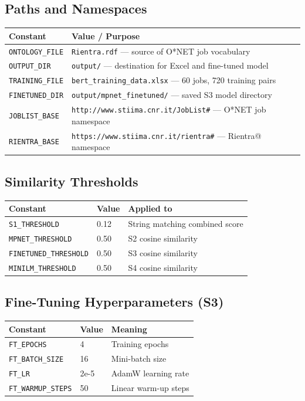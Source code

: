 ﻿\documentclass[12pt,a4paper]{article}
\begin{document}
\subsection{Paths and Namespaces}

\begin{longtable}{@{}P{4.5cm}P{10cm}@{}}
\toprule
\textbf{Constant} & \textbf{Value / Purpose} \\
\midrule
\endhead
\texttt{ONTOLOGY\_FILE} & \texttt{Rientra.rdf} --- source of O*NET job vocabulary \\
\texttt{OUTPUT\_DIR} & \texttt{output/} --- destination for Excel and fine-tuned model \\
\texttt{TRAINING\_FILE} & \texttt{bert\_training\_data.xlsx} --- 60 jobs, 720 training pairs \\
\texttt{FINETUNED\_DIR} & \texttt{output/mpnet\_finetuned/} --- saved S3 model directory \\
\texttt{JOBLIST\_BASE} & \texttt{http://www.stiima.cnr.it/JobList\#} --- O*NET job namespace \\
\texttt{RIENTRA\_BASE} & \texttt{https://www.stiima.cnr.it/rientra\#} --- Rientra@ namespace \\
\bottomrule
\end{longtable}

\subsection{Similarity Thresholds}

\begin{longtable}{@{}P{4.5cm}P{3cm}P{7cm}@{}}
\toprule
\textbf{Constant} & \textbf{Value} & \textbf{Applied to} \\
\midrule
\endhead
\texttt{S1\_THRESHOLD} & 0.12 & String matching combined score \\
\texttt{MPNET\_THRESHOLD} & 0.50 & S2 cosine similarity \\
\texttt{FINETUNED\_THRESHOLD} & 0.50 & S3 cosine similarity \\
\texttt{MINILM\_THRESHOLD} & 0.50 & S4 cosine similarity \\
\bottomrule
\end{longtable}

\subsection{Fine-Tuning Hyperparameters (S3)}

\begin{longtable}{@{}P{4cm}P{3cm}P{7.5cm}@{}}
\toprule
\textbf{Constant} & \textbf{Value} & \textbf{Meaning} \\
\midrule
\endhead
\texttt{FT\_EPOCHS} & 4 & Training epochs \\
\texttt{FT\_BATCH\_SIZE} & 16 & Mini-batch size \\
\texttt{FT\_LR} & 2e-5 & AdamW learning rate \\
\texttt{FT\_WARMUP\_STEPS} & 50 & Linear warm-up steps \\
\bottomrule
\end{longtable}
\end{document}
